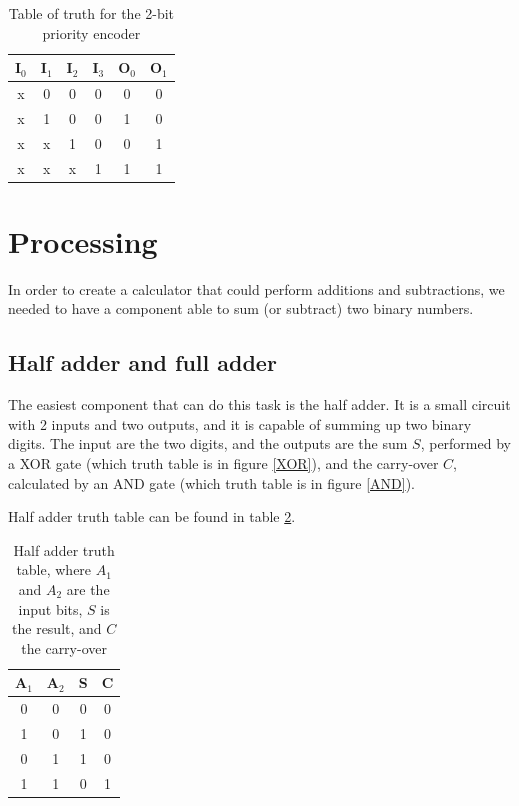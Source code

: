 \documentclass{article}
\begin{document}
\begin{table}[h]
  \centering
  \begin{tabular}{| c | c | c | c || c | c |}
  \hline
  I$_0$ & I$_1$ & I$_2$ & I$_3$ & O$_0$ & O$_1$ \\ \hline
  x & 0 & 0 & 0 & 0 & 0 \\ \hline
  x & 1 & 0 & 0 & 1 & 0 \\ \hline
  x & x & 1 & 0 & 0 & 1 \\ \hline
  x & x & x & 1 & 1 & 1 \\ \hline
  \end{tabular}
  \caption{Table of truth for the 2-bit priority encoder}
  \label{Table_priority_encoder}
\end{table}

\clearpage









\section{Processing}

In order to create a calculator that could perform additions and subtractions, we needed to have a component able to sum (or subtract) two binary numbers.

\subsection{Half adder and full adder}

The easiest component that can do this task is the half adder. It is a small circuit with 2 inputs and two outputs, and it is capable of summing up two binary digits. The input are the two digits, and the outputs are the sum $S$, performed by a XOR gate (which truth table is in figure \ref{XOR}), and the carry-over $C$, calculated by an AND gate (which truth table is in figure \ref{AND}).

\vspace{3mm}

Half adder truth table can be found in table \ref{HalfAdderTT}.

\begin{table}[h]
  \centering
  \begin{tabular}{| c | c || c | c |}
  \hline
  A$_1$ & A$_2$ & S & C \\ \hline
  0 & 0 & 0 & 0 \\ \hline
  1 & 0 & 1 & 0 \\ \hline
  0 & 1 & 1 & 0 \\ \hline
  1 & 1 & 0 & 1 \\ \hline
  \end{tabular}
  \caption{Half adder truth table, where $A_1$ and $A_2$ are the input bits, $S$ is the result, and $C$ the carry-over}
  \label{HalfAdderTT}
\end{table}
\end{document}
